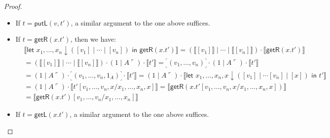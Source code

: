\documentclass[twoside,11pt,final]{entics}
\newcommand{\getl}{\mathsf{getL}}
\newcommand{\putr}{\mathsf{putR}}
\newcommand{\getr}{\mathsf{getR}}
\newcommand{\putl}{\mathsf{putL}}
\newcommand{\corner}[1]{{\text{}^\ulcorner_\llcorner\!{#1}\!_\lrcorner^\urcorner}}
\newcommand{\asn}{\downarrow}
\newcommand{\seq}{,\!\ldots\!,}
\begin{document}
\begin{proof}
\begin{itemize}
\begin{align*}
      \\&= \llbracket \putr(v[u_1\seq u_m/y_1\seq y_m],t'[v_1 \seq v_n/x_1 \seq x_n]) \rrbracket
      \\&= \llbracket \putr(v,t')[v_1\seq v_n,u_1 \seq u_m/x_1 \seq x_n,y_1 \seq y_m] \rrbracket
    \end{align*}
  \item If $t = \putl(v,t')$, a similar argument to the one above suffices.
  \item If $t = \getr(x.t')$, then we have:
    \begin{align*}
      & \llbracket \textsf{let } x_1 \seq x_n \asn ([v_1] \mid \cdots \mid [v_n]) \textsf{ in } \getr(x.t') \rrbracket
        = (\llbracket [v_1] \rrbracket \mid \cdots \mid \llbracket [v_n] \rrbracket ) \cdot \llbracket \getr(x.t') \rrbracket
      \\&= (\llbracket [v_1] \rrbracket \mid \cdots \mid \llbracket [v_n] \rrbracket ) \cdot (1 \mid A\ulcorner) \cdot \llbracket t' \rrbracket
      = \corner{(v_1\seq v_n)} \cdot (1 \mid A\ulcorner) \cdot \llbracket t' \rrbracket
      \\&= (1 \mid A\ulcorner) \cdot \corner{(v_1 \seq v_n,1_A)} \cdot \llbracket t' \rrbracket
      = (1 \mid A\ulcorner) \cdot \llbracket \textsf{let } x_1 \seq x_n,x \asn ([v_1] \mid \cdots [v_n] \mid [x]) \textsf{ in } t' \rrbracket
      \\&= (1 \mid A\ulcorner) \cdot \llbracket t'[v_1\seq v_n,x / x_1 \seq x_n,x] \rrbracket
      = \llbracket \getr(x.t'[v_1 \seq v_n,x / x_1 \seq x_n,x]) \rrbracket
      \\&= \llbracket \getr(x.t')[v_1 \seq v_n / x_1 \seq x_n]\rrbracket
    \end{align*}
  \item If $t = \getl(x.t')$, a similar argument to the one above suffices.
  \end{itemize}
\end{proof}
\end{document}
